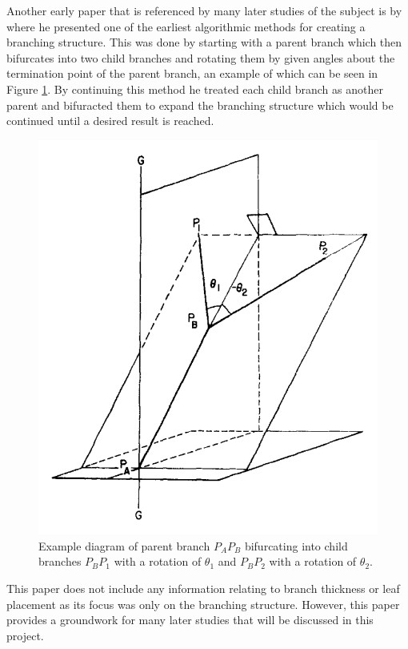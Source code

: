 \documentclass[final]{cmpreport}
\begin{document}
Another early paper that is referenced by many later studies of the subject is by
\cite{honda1971description} where he presented one of the earliest algorithmic 
methods for creating a branching structure. This was done by starting with a parent 
branch which then bifurcates into two child branches and rotating them by given 
angles about the termination point of the parent branch, an example of which 
can be seen in Figure \ref{fig:honda-bifurcation}. By continuing this 
method he treated each child branch as another parent and bifuracted them to 
expand the branching structure which would be continued until a desired result is 
reached.

\begin{figure}[ht]
    \includegraphics[scale=0.5]{honda-bifurcation.PNG}
    \centering
    \captionsetup{justification=centering}
    \caption{Example diagram of parent branch $P_AP_B$ bifurcating into child branches
    $P_BP_1$ with a rotation of $\theta_1$ and $P_BP_2$ with a rotation of \textminus$\theta_2$.}
    \label{fig:honda-bifurcation}
\end{figure}

This paper does not include any information relating to branch thickness or leaf 
placement as its focus was only on the branching structure. However, this paper 
provides a groundwork for many later studies that will be discussed in this project.
\end{document}
